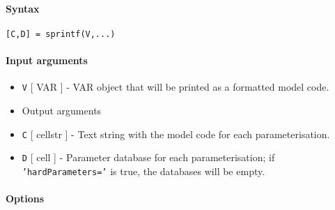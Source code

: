 


	\paragraph{Syntax}\label{syntax}

\begin{verbatim}
[C,D] = sprintf(V,...)
\end{verbatim}

\paragraph{Input arguments}\label{input-arguments}

\begin{itemize}
\item
  \texttt{V} {[} VAR {]} - VAR object that will be printed as a
  formatted model code.
\item
  Output arguments
\item
  \texttt{C} {[} cellstr {]} - Text string with the model code for each
  parameterisation.
\item
  \texttt{D} {[} cell {]} - Parameter database for each
  parameterisation; if \texttt{'hardParameters='} is true, the databases
  will be empty.
\end{itemize}

\paragraph{Options}\label{options}

